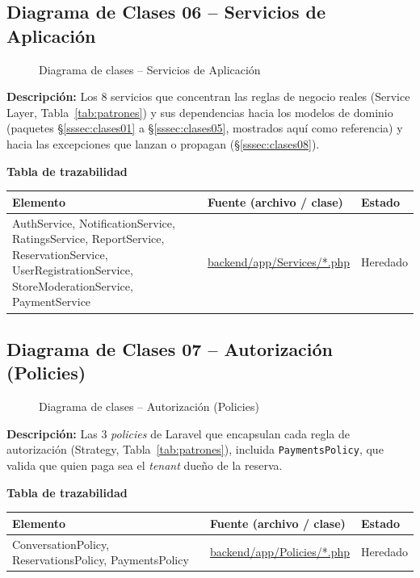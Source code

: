\subsection{Diagrama de Clases 06 -- Servicios de Aplicación}
\label{sssec:clases06}
\begin{figure}[H]
    \centering
    \caption{Diagrama de clases -- Servicios de Aplicación}
    \label{fig:clases06}
\end{figure}
\noindent\textbf{Descripción:} Los 8 servicios que concentran las reglas de negocio reales (Service Layer, Tabla~\ref{tab:patrones}) y sus dependencias hacia los modelos de dominio (paquetes \S\ref{sssec:clases01} a \S\ref{sssec:clases05}, mostrados aquí como referencia) y hacia las excepciones que lanzan o propagan (\S\ref{sssec:clases08}).

\bigskip
\noindent\textbf{Tabla de trazabilidad}
\begin{longtable}{|L{5.5cm}|L{7.5cm}|M{2cm}|}
\hline
{} \textbf{Elemento} & \textbf{Fuente (archivo / clase)} & \textbf{Estado} \\ \hline
\endhead
AuthService, NotificationService, RatingsService, ReportService, ReservationService, UserRegistrationService, StoreModerationService, PaymentService & \url{backend/app/Services/*.php} & Heredado \\ \hline
\end{longtable}
\clearpage

\subsection{Diagrama de Clases 07 -- Autorización (Policies)}
\label{sssec:clases07}
\begin{figure}[H]
    \centering
    \caption{Diagrama de clases -- Autorización (Policies)}
    \label{fig:clases07}
\end{figure}
\noindent\textbf{Descripción:} Las 3 \textit{policies} de Laravel que encapsulan cada regla de autorización (Strategy, Tabla~\ref{tab:patrones}), incluida \texttt{PaymentsPolicy}, que valida que quien paga sea el \textit{tenant} dueño de la reserva.

\bigskip
\noindent\textbf{Tabla de trazabilidad}
\begin{longtable}{|L{5.5cm}|L{7.5cm}|M{2cm}|}
\hline
{} \textbf{Elemento} & \textbf{Fuente (archivo / clase)} & \textbf{Estado} \\ \hline
\endhead
ConversationPolicy, ReservationsPolicy, PaymentsPolicy & \url{backend/app/Policies/*.php} & Heredado \\ \hline
\end{longtable}
\clearpage

